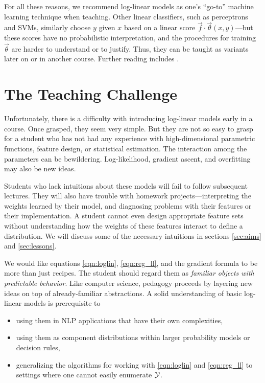 \documentclass[11pt,letterpaper]{article}
\begin{document}
For all these reasons, we recommend log-linear models as one's
``go-to'' machine learning technique when teaching.  Other linear
classifiers, such as perceptrons and SVMs, similarly choose $y$ given
$x$ based on a linear score $\vec{f} \cdot \vec{\theta}(x,y)$---but
these scores have no probabilistic interpretation, and the procedures
for training $\vec{\theta}$ are harder to understand or to justify.
Thus, they can be taught as variants later on or in another course.
Further reading includes \cite{smith-2011}.

\section{The Teaching Challenge} \label{sec:challenges}

Unfortunately, there is a difficulty with introducing log-linear
models early in a course.  Once grasped, they seem very simple.  But
they are not so easy to grasp for a student who has not had any
experience with high-dimensional parametric functions, feature
design, or statistical estimation.  The interaction among the parameters can be
bewildering.  Log-likelihood, gradient ascent, and overfitting may also
be new ideas.

Students who lack intuitions about these models will fail to follow
subsequent lectures.  They will also have trouble with homework
projects---interpreting the weights learned by their model, and
diagnosing problems with their features or their implementation.  A
student cannot even design appropriate feature sets without
understanding how the weights of these features interact to define a
distribution.  We will discuss some of the necessary intuitions in
sections \ref{sec:aims} and \ref{sec:lessons}.

We would like equations \eqref{eqn:loglin}, \eqref{eqn:reg_ll}, and the
gradient formula to be more than just recipes.  The student should
regard them as {\em familiar objects with predictable behavior}.  Like
computer science, pedagogy proceeds by layering new ideas on top of
already-familiar abstractions.  A solid understanding of basic
log-linear models is prerequisite to 
\begin{itemize}
\item using them in NLP applications that have their own complexities, 
\item using them as component distributions within larger probability
  models or decision rules,
\item generalizing the algorithms for working with \eqref{eqn:loglin}
  and \eqref{eqn:reg_ll} to settings where one cannot easily enumerate
  ${\cal Y}$.
\end{itemize}
  
\end{document}
